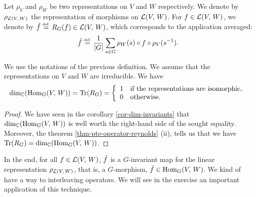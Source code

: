 \begin{defn}
\label{defn-applications-averages}
\label{notation-88} Let $ \rho_V $ and $ \rho_W $ be two representations on $V$ and $ W $ respectively. We denote by $ \rho_{\mathcal{L} (V, \, W)} $ the representation of morphisms on $ \mathcal{L} (V, \, W) $. For $ f \in \mathcal{L} (V, \, W) $, we denote by $ \tilde{f} \stackrel{\mbox{\upshape\tiny def.}}{=} R_G (f) \in \mathcal{L} (V, \, W) $, which corresponds to the application averaged:
\begin{equation*}
\tilde{f} \stackrel{\mbox{\upshape\tiny def.}}{=} \frac{1}{|G|} \sum_{s \in G}{\rho_W (s) \circ f \circ \rho_V (s^{-1})}.
\end{equation*}
\end{defn}
 
 
\begin{prop}
\label{prop-application-g-morphisms}
We use the notations of the previous definition. We assume that the representations on $V$ and $ W $ are irreducible. We have
\begin{equation*}
\dim_{\mathbb{C}} (\operatorname{Hom}_G (V, \, W)) = \operatorname{Tr} (R_G) = \left\{\begin{array}{ll} 1 & \text{if the representations are isomorphic,} \\0 & \text{otherwise. } \end{array} \right.
\end{equation*}
\end{prop}
\begin{proof}
We have seen in the corollary \ref{cor-dim-invariants} that $ \dim_{\mathbb{C}} (\operatorname{Hom}_G (V, \, W)) $ is well worth the right-hand side of the sought equality. Moreover, the theorem \ref{thm-pte-operator-reynolds} (ii), tells us that we have $ \operatorname{Tr} (R_G) = \dim_{\mathbb{C}} (\operatorname{Hom}_G (V, \, W) ) $.
\end{proof}
In the end, for all $ f \in \mathcal{L} (V, \, W) $, $ \tilde{f} $ is a $G$-invariant map for the linear representation $ \rho_{\mathcal{L} (V, \, W)} $, that is, a $G$-morphism, $ \tilde{f} \in \operatorname{Hom}_G (V, \, W) $. We kind of have a way to  interleaving operators. We will see in the exercise  an important application of this technique.

